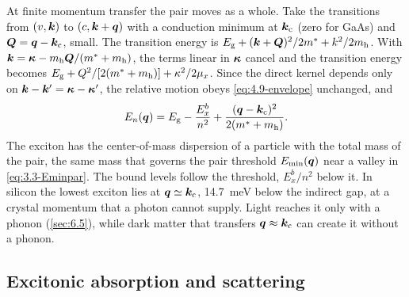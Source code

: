 At finite momentum transfer the pair moves as a whole. Take the transitions from $(v,\bm{k})$ to $(c,\bm{k}+\bm{q})$ with a conduction minimum at $\bm{k}_{\mathrm{c}}$ (zero for GaAs) and $\bm{Q} = \bm{q} - \bm{k}_{\mathrm{c}}$, small. The transition energy is $E_{\mathrm{g}} + (\bm{k} + \bm{Q})^2/2m^* + k^2/2m_{\mathrm{h}}$. With $\bm{k} = \bm{\kappa} - m_{\mathrm{h}}\bm{Q}/(m^* + m_{\mathrm{h}})$, the terms linear in $\bm{\kappa}$ cancel and the transition energy becomes $E_{\mathrm{g}} + Q^2/[2(m^* + m_{\mathrm{h}})] + \kappa^2/2\mu_x$. Since the direct kernel depends only on $\bm{k} - \bm{k}' = \bm{\kappa} - \bm{\kappa}'$, the relative motion obeys \cref{eq:4.9-envelope} unchanged, and
\begin{equation}
  E_n(\bm{q}) = E_{\mathrm{g}} - \frac{E_x^b}{n^2} + \frac{(\bm{q} - \bm{k}_{\mathrm{c}})^2}{2(m^* + m_{\mathrm{h}})} .
  \label{eq:4.9-dispersion}
\end{equation}
The exciton has the center-of-mass dispersion of a particle with the total mass of the pair, the same mass that governs the pair threshold $E_{\mathrm{min}}(\bm{q})$ near a valley in \cref{eq:3.3-Eminpar}. The bound levels follow the threshold, $E_{x}^b/n^2$ below it. In silicon the lowest exciton lies at $\bm{q} \simeq \bm{k}_{\mathrm{c}}$, \SI{14.7}{meV} below the indirect gap, at a crystal momentum that a photon cannot supply. Light reaches it only with a phonon (\cref{sec:6.5}), while dark matter that transfers $\bm{q} \approx \bm{k}_{\mathrm{c}}$ can create it without a phonon.

\subsection{Excitonic absorption and scattering}

